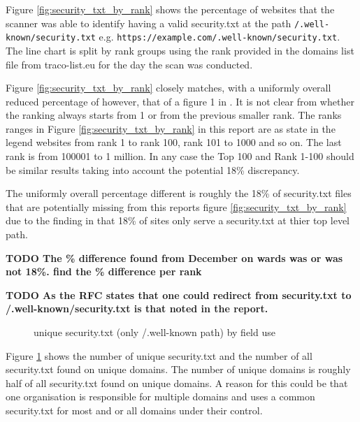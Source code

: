 \documentclass{mscreport}
\begin{document}
\noindent
Figure \ref{fig:security_txt_by_rank} shows the percentage of websites that the scanner was able to identify having a valid security.txt at the path \texttt{/.well-known/security.txt} e.g. \newline \texttt{https://example.com/.well-known/security.txt}. The line chart is split by rank groups using the rank provided in the domains list file from traco-list.eu for the day the scan was conducted.

\vspace{0.3cm} \noindent
Figure \ref{fig:security_txt_by_rank} closely matches, with a uniformly overall reduced percentage of however, that of a figure 1 in \cite{Poteat2021-zr}. It is not clear from \cite{Poteat2021-zr} whether the ranking always starts from 1 or from the previous smaller rank. The ranks ranges in Figure \ref{fig:security_txt_by_rank} in this report are as state in the legend websites from rank 1 to rank 100, rank 101 to 1000 and so on. The last rank is from 100001 to 1 million. In any case the Top 100 and Rank 1-100 should be similar results taking into account the potential 18\% discrepancy.

\vspace{0.3cm} \noindent
The uniformly overall percentage different is roughly the 18\% of security.txt files that are potentially missing from this reports figure \ref{fig:security_txt_by_rank} due to the finding in \cite{Poteat2021-zr} that 18\% of sites only serve a security.txt at thier top level path.

\clearpage
\newpage

\vspace{0.3cm} \noindent
\textbf{TODO The \% difference found from December on wards was or was not 18\%. find the \% difference per rank}

\vspace{0.3cm} \noindent
\textbf{TODO As the RFC states that one could redirect from security.txt to /.well-known/security.txt is that noted in the report.}

\begin{figure}[H]
	\begin{center}
		\caption{unique security.txt (only /.well-known path) by field use}
		\label{fig:security_txt_unique_vs_domains}
	\end{center}
\end{figure}

\noindent
Figure \ref{fig:security_txt_unique_vs_domains} shows the number of unique security.txt and the number of all security.txt found on unique domains. The number of unique domains is roughly half of all security.txt found on unique domains. A reason for this could be that one organisation is responsible for multiple domains and uses a common security.txt for most and or all domains under their control.
\end{document}
